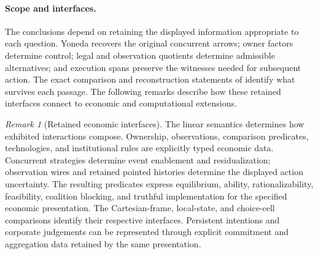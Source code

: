 \documentclass[11pt,a4paper]{article}
\numberwithin{equation}{section}
\theoremstyle{definition}
\theoremstyle{remark}
\newtheorem{remark}[theorem]{Remark}
\theoremstyle{plain}
\begin{document}
\paragraph{Scope and interfaces.}\label{sec:egt-boundary}
The conclusions depend on retaining the displayed information appropriate
to each question. Yoneda recovers the original concurrent arrows;
owner factors determine control; legal and observation quotients
determine admissible alternatives; and execution spans preserve the
witnesses needed for subsequent action. The exact comparison and
reconstruction statements of
identify what survives each passage. The following remarks describe how these retained interfaces connect
to economic and computational extensions.

\begin{remark}[Retained economic interfaces]
The linear semantics determines how exhibited interactions compose.
Ownership, observations, comparison predicates, technologies, and
institutional rules are explicitly typed economic data. Concurrent
strategies determine event enablement and residualization; observation
wires and retained pointed histories determine the displayed action
uncertainty. The resulting predicates express equilibrium, ability,
rationalizability, feasibility, coalition blocking, and truthful
implementation for the specified economic presentation. The
Cartesian-frame, local-state, and choice-cell comparisons identify their
respective interfaces. Persistent intentions and corporate judgements
can be represented through explicit commitment and aggregation data
retained by the same presentation.
\end{remark}
\end{document}

